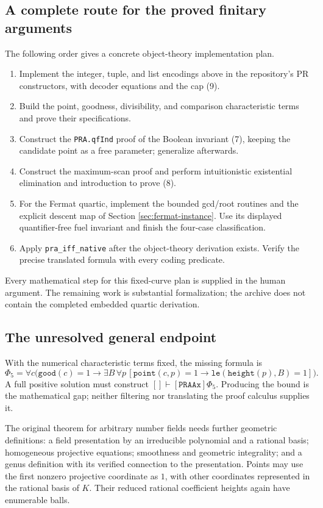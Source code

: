 \documentclass[11pt,letterpaper]{article}
\theoremstyle{definition}
\begin{document}
\subsection{A complete route for the proved finitary arguments}
The following order gives a concrete object-theory implementation plan.
\begin{enumerate}
\item Implement the integer, tuple, and list encodings above in the
repository's PR constructors, with decoder equations and the cap (9).
\item Build the point, goodness, divisibility, and comparison
characteristic terms and prove their specifications.
\item Construct the \texttt{PRA.qfInd} proof of the Boolean invariant (7),
keeping the candidate point as a free parameter; generalize afterwards.
\item Construct the maximum-scan proof and perform intuitionistic
existential elimination and introduction to prove (8).
\item For the Fermat quartic, implement the bounded gcd/root routines
and the explicit descent map of Section \ref{sec:fermat-instance}.
Use its displayed quantifier-free fuel invariant and finish the four-case
classification.
\item Apply \texttt{pra\_iff\_native} after the object-theory derivation
exists. Verify the precise translated formula with every coding predicate.
\end{enumerate}
Every mathematical step for this fixed-curve plan is supplied in the
human argument. The remaining work is substantial formalization;
the archive does not contain the completed embedded quartic derivation.

\subsection{The unresolved general endpoint}
With the numerical characteristic terms fixed, the missing formula is
\[
 \Phi_5=\forall c\bigl(\mathtt{good}(c)=1\to
 \exists B\,\forall p\,[
 \mathtt{point}(c,p)=1\to
 \mathtt{le}(\mathtt{height}(p),B)=1]\bigr).
\]
A full positive solution must construct
$[]\vdash[\mathtt{PRAAx}]\Phi_5$. Producing the bound is the mathematical
gap; neither filtering nor translating the proof calculus supplies it.

The original theorem for arbitrary number fields needs further geometric
definitions: a field presentation by an irreducible polynomial and a
rational basis; homogeneous projective equations; smoothness and geometric
integrality; and a genus definition with its verified connection to the
presentation. Points may use the first nonzero projective coordinate as
$1$, with other coordinates represented in the rational basis of $K$.
Their reduced rational coefficient heights again have enumerable balls.
\end{document}
